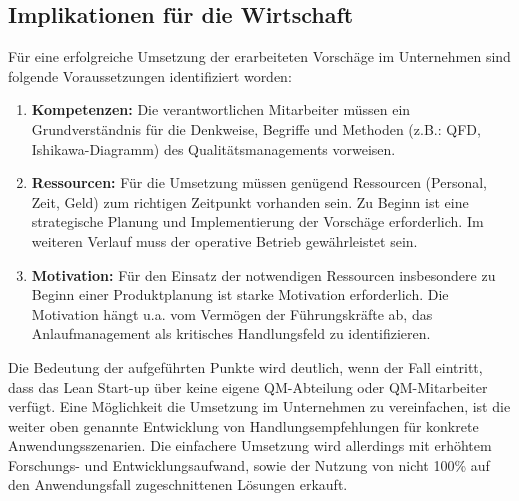 \subsection*{Implikationen für die Wirtschaft}

Für eine erfolgreiche Umsetzung der erarbeiteten Vorschäge im Unternehmen sind folgende Voraussetzungen identifiziert worden: 
\begin{enumerate}
 \item \textbf{Kompetenzen: } Die verantwortlichen Mitarbeiter müssen ein Grundverständnis für die Denkweise, Begriffe und Methoden (z.B.: QFD, Ishikawa-Diagramm) des Qualitätsmanagements vorweisen. 
 \item \textbf{Ressourcen: } Für die Umsetzung müssen genügend Ressourcen (Personal, Zeit, Geld) zum richtigen Zeitpunkt vorhanden sein. Zu Beginn ist eine strategische Planung und Implementierung der Vorschäge erforderlich. Im weiteren Verlauf muss der operative Betrieb gewährleistet sein. 
 \item \textbf{Motivation: } Für den Einsatz der notwendigen Ressourcen insbesondere zu Beginn einer Produktplanung ist starke Motivation erforderlich. Die Motivation hängt u.a. vom Vermögen der Führungskräfte ab, das Anlaufmanagement als kritisches Handlungsfeld zu identifizieren. 
\end{enumerate}

Die Bedeutung der aufgeführten Punkte wird deutlich, wenn der Fall eintritt, dass das Lean Start-up über keine eigene QM-Abteilung oder QM-Mitarbeiter verfügt. 
Eine Möglichkeit die Umsetzung im Unternehmen zu vereinfachen, ist die weiter oben genannte Entwicklung von Handlungsempfehlungen für konkrete Anwendungsszenarien. Die einfachere Umsetzung wird allerdings mit erhöhtem Forschungs- und Entwicklungsaufwand, sowie der Nutzung von nicht 100\% auf den Anwendungsfall zugeschnittenen Lösungen erkauft. 